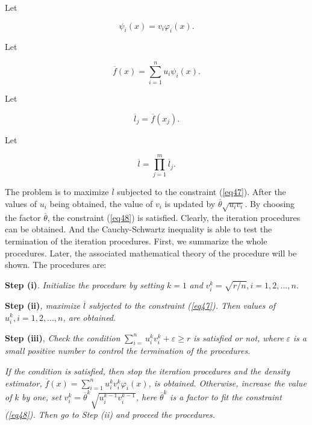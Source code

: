 \documentclass [18pt]{article}
\begin{document}
Let


\begin{equation}
\label{eq59}
\psi _i (x) = v_i \varphi _i (x).
\end{equation}



Let


\begin{equation}
\label{eq60}
\overline f (x) = \sum\limits_{i = 1}^n {u_i } \psi _i (x).
\end{equation}



Let


\begin{equation}
\label{eq61}
\overline l _j = \overline f (x_j ).
\end{equation}



Let


\begin{equation}
\label{eq62}
\overline l = \prod\limits_{j = 1}^m {\overline l _j } .
\end{equation}



The problem is to maximize $\overline l $ subjected to the constraint (\ref{eq47}).
After the values of $u_i $ being obtained, the value of $v_i $ is updated by
$\overline \theta \sqrt {u_i v_i } $. By choosing the factor $\overline
\theta $, the constraint (\ref{eq48}) is satisfied. Clearly, the iteration
procedures can be obtained. And the Cauchy-Schwartz inequality is able to
test the termination of the iteration procedures. First, we summarize the
whole procedures. Later, the associated mathematical theory of the procedure
will be shown. The procedures are:

\textbf{Step (i)}. \textit{Initialize the procedure by setting }$k = 1$\textit{ and }$v_i^k = \sqrt {r / n} , i = 1,2,...,n.$

\textbf{Step (ii)}\textit{, maximize }$\overline l $\textit{ subjected to the constraint (\ref{eq47}). Then values of }$u_i^k ,i = 1,2,...,n$\textit{, are obtained}.

\textbf{Step (iii)}, \textit{Check the condition }$\sum\limits_{i = }^n {u_i^k v_i^k + \varepsilon \ge r}
$\textit{ is satisfied or not, where }$\varepsilon $\textit{ is a small positive number to control the termination of the procedures.}

\textit{If the condition is satisfied, then stop the iteration procedures and the density estimator, }$\overline f (x) = \sum\limits_{i = 1}^n {u_i^k v_i^k } \varphi _i (x)$\textit{, is obtained. Otherwise, increase the value of }$k$\textit{ by one, set }$v_i^k
= \overline \theta ^k\sqrt {u_i^{k - 1} v_i^{k - 1} } $\textit{, here }$\overline \theta
^k$\textit{ is a factor to fit the constraint (\ref{eq48}). Then go to Step (ii) and proceed the procedures.}
\end{document}
